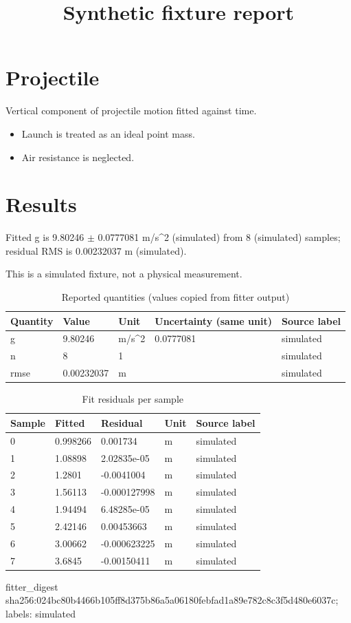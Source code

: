 \documentclass[11pt]{article}
\title{Synthetic fixture report}
\author{}\date{}
\begin{document}
\maketitle
\section*{Projectile}
Vertical component of projectile motion fitted against time.

\begin{itemize}
\item Launch is treated as an ideal point mass.
\item Air resistance is neglected.
\end{itemize}
\section*{Results}
Fitted g is 9.80246 $\pm$ 0.0777081 m/s\textasciicircum{}2 (simulated) from 8 (simulated) samples; residual RMS is 0.00232037 m (simulated).

This is a simulated fixture, not a physical measurement.
\begin{longtable}{lllll}
\caption{Reported quantities (values copied from fitter output)}\\ \hline
Quantity & Value & Unit & Uncertainty (same unit) & Source label \\ \hline \endhead
g & 9.80246 & m/s\textasciicircum{}2 & 0.0777081 & simulated \\
n & 8 & 1 &  & simulated \\
rmse & 0.00232037 & m &  & simulated \\
\hline\end{longtable}
\begin{longtable}{lllll}
\caption{Fit residuals per sample}\\ \hline
Sample & Fitted & Residual & Unit & Source label \\ \hline \endhead
0 & 0.998266 & 0.001734 & m & simulated \\
1 & 1.08898 & 2.02835e-05 & m & simulated \\
2 & 1.2801 & -0.0041004 & m & simulated \\
3 & 1.56113 & -0.000127998 & m & simulated \\
4 & 1.94494 & 6.48285e-05 & m & simulated \\
5 & 2.42146 & 0.00453663 & m & simulated \\
6 & 3.00662 & -0.000623225 & m & simulated \\
7 & 3.6845 & -0.00150411 & m & simulated \\
\hline\end{longtable}
\noindent fitter\_digest sha256:024bc80b4466b105ff8d375b86a5a06180febfad1a89e782c8c3f5d480e6037c; labels: simulated
\end{document}
